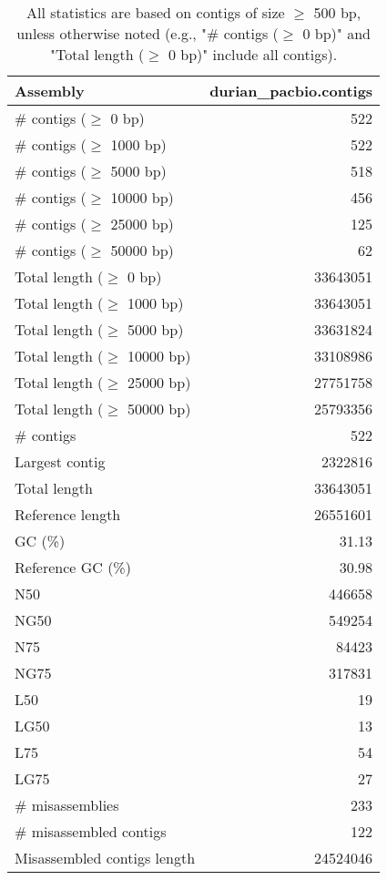 \documentclass[12pt,a4paper]{article}
\begin{document}
\begin{table}[ht]
\begin{center}
\caption{All statistics are based on contigs of size $\geq$ 500 bp, unless otherwise noted (e.g., "\# contigs ($\geq$ 0 bp)" and "Total length ($\geq$ 0 bp)" include all contigs).}
\begin{tabular}{|l*{1}{|r}|}
\hline
Assembly & durian\_pacbio.contigs \\ \hline
\# contigs ($\geq$ 0 bp) & 522 \\ \hline
\# contigs ($\geq$ 1000 bp) & 522 \\ \hline
\# contigs ($\geq$ 5000 bp) & 518 \\ \hline
\# contigs ($\geq$ 10000 bp) & 456 \\ \hline
\# contigs ($\geq$ 25000 bp) & 125 \\ \hline
\# contigs ($\geq$ 50000 bp) & 62 \\ \hline
Total length ($\geq$ 0 bp) & 33643051 \\ \hline
Total length ($\geq$ 1000 bp) & 33643051 \\ \hline
Total length ($\geq$ 5000 bp) & 33631824 \\ \hline
Total length ($\geq$ 10000 bp) & 33108986 \\ \hline
Total length ($\geq$ 25000 bp) & 27751758 \\ \hline
Total length ($\geq$ 50000 bp) & 25793356 \\ \hline
\# contigs & 522 \\ \hline
Largest contig & 2322816 \\ \hline
Total length & 33643051 \\ \hline
Reference length & 26551601 \\ \hline
GC (\%) & 31.13 \\ \hline
Reference GC (\%) & 30.98 \\ \hline
N50 & 446658 \\ \hline
NG50 & 549254 \\ \hline
N75 & 84423 \\ \hline
NG75 & 317831 \\ \hline
L50 & 19 \\ \hline
LG50 & 13 \\ \hline
L75 & 54 \\ \hline
LG75 & 27 \\ \hline
\# misassemblies & 233 \\ \hline
\# misassembled contigs & 122 \\ \hline
Misassembled contigs length & 24524046 \\ \hline

\end{tabular}
\end{center}
\end{table}
\end{document}
